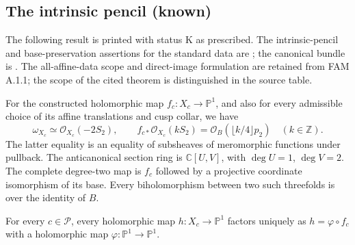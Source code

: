 \subsection{The intrinsic pencil (known)}
The following result is printed with status K as prescribed. The intrinsic-pencil and base-preservation assertions for the standard data are \cite[Theorem 7.1]{DGKXv1}; the canonical bundle is \cite[Main Theorem (4); Theorem 9.1]{AC26}. The all-affine-data scope and direct-image formulation are retained from FAM A.1.1; the scope of the cited theorem is distinguished in the source table.
\begin{cited}[FAM A.1.1; K]\label{fam:A.1.1}
For the constructed holomorphic map $f_c:X_c\to\mathbb P^1$, and also for every admissible choice of its affine translations and cusp collar, we have
\[
 \omega_{X_c}\simeq\mathcal O_{X_c}(-2S_2),\qquad
 f_{c*}\mathcal O_{X_c}(kS_2)=\mathcal O_B(\lfloor k/4\rfloor p_2)\quad(k\in\mathbb Z).
\]
The latter equality is an equality of subsheaves of meromorphic functions under pullback. The anticanonical section ring is $\mathbb C[U,V]$, with $\deg U=1$, $\deg V=2$. The complete degree-two map is $f_c$ followed by a projective coordinate isomorphism of its base. Every biholomorphism between two such threefolds is over the identity of $B$.
\end{cited}
\begin{cited}\label{dgkx:all-maps-factor}
For every $c\in\mathcal P$, every holomorphic map
$h:X_c\to\mathbb P^1$ factors uniquely as
$h=\varphi\circ f_c$ with a holomorphic map
$\varphi:\mathbb P^1\to\mathbb P^1$.
\end{cited}

